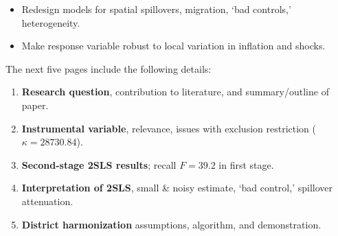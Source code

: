 \documentclass[letterpaper,12pt]{article}
\begin{document}
\begin{enumerate}
\begin{itemize}
\vspace{-1mm}

\item Redesign models for spatial spillovers, migration, `bad controls,' heterogeneity. 

\vspace{-1mm}

\item Make response variable robust to local variation in inflation and shocks.
\end{itemize}
\vspace{1mm}


\end{enumerate}


\noindent The next five pages include the following details: 

\begin{enumerate}
\item[6:] \textbf{Research question}, contribution to literature, and summary/outline of paper.
\item[23:] \textbf{Instrumental variable}, relevance, issues with exclusion restriction ($\kappa=28730.84$).
\item[27:] \textbf{Second-stage 2SLS results}; recall $F=39.2$ in first stage.
\item[28:] \textbf{Interpretation of 2SLS}, small \& noisy estimate, `bad control,' spillover attenuation. 
\item[33:] \textbf{District harmonization} assumptions, algorithm, and demonstration.

\end{enumerate}
\end{document}
